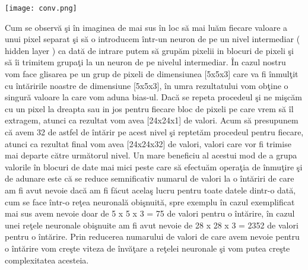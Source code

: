 \begin{center}
\texttt{[image: conv.png]}
\end{center}

Cum se observ\u{a} \c{s}i \^{i}n imaginea de mai sus \^{i}n loc s\u{a} mai lu\u{a}m fiecare valoare a unui pixel separat \c{s}i s\u{a} o introducem \^{i}ntr-un neuron de pe un nivel intermediar ( hidden layer ) ca dat\u{a} de intrare putem s\u{a} grup\u{a}m pixelii in blocuri de pixeli \c{s}i s\u{a} \^{i}i trimitem grupa\c{t}i la un neuron de pe nivelul intermediar. \^{I}n cazul nostru vom face glisarea pe un grup de pixeli de dimensiunea [5x5x3] care va fi \^{i}nmul\c{t}it cu \^{i}nt\u{a}ririle noastre de dimensiune [5x5x3], \^{i}n umra rezultatului vom ob\c{t}ine o singur\u{a} valoare la care vom aduna bias-ul. Dac\u{a} se repeta procedeul  \c{s}i ne mi\c{s}c\u{a}m cu un pixel la dreapta sau in jos pentru fiecare bloc de pixeli pe care vrem s\u{a} \^{i}l extragem, atunci ca rezultat vom avea [24x24x1] de valori. Acum s\u{a} presupunem c\u{a} avem 32 de astfel de \^{i}nt\u{a}rir pe acest nivel \c{s}i reptet\u{a}m procedeul pentru fiecare, atunci ca rezultat final vom avea [24x24x32] de valori, valori care vor fi trimise mai departe c\u{a}tre urm\u{a}torul nivel. Un mare beneficiu al acestui mod de a grupa valorile \^{i}n blocuri de date mai mici peste care s\u{a} efectu\u{a}m opera\c{t}ia de \^{i}nmu\c{t}ire \c{s}i de adunare este c\u{a} se reduce semnificativ numarul de valori la o  \^{i}nt\u{a}riri de care am fi avut nevoie dac\u{a} am fi f\u{a}cut acela\c{s} lucru pentru toate datele dintr-o dat\u{a}, cum se face \^{i}ntr-o re\c{t}ea neuronal\u{a} obi\c{s}nuit\u{a}, spre exemplu \^{i}n cazul exemplificat mai sus avem nevoie doar de 5 x 5 x 3 = 75 de valori pentru o \^{i}nt\u{a}rire, \^{i}n cazul unei re\c{t}ele neuronale obi\c{s}nuite am fi avut nevoie de 28 x 28 x 3 = 2352 de valori pentru o \^{i}nt\u{a}rire. Prin reducerea numarului de valori de care avem nevoie pentru o \^{i}nt\u{a}rire vom cre\c{s}te viteza de \^{i}nv\u{a}\c{t}are a re\c{t}elei neuronale \c{s}i vom putea cre\c{s}te complexitatea acesteia.

\par

